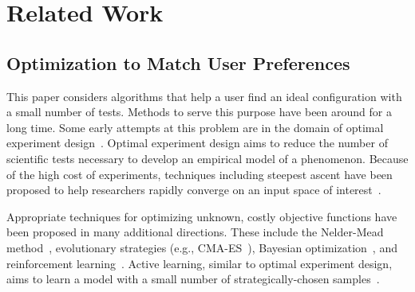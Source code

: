 \section{Related Work}

\subsection{Optimization to Match User Preferences}

This paper considers algorithms that help a user find an ideal configuration with a small number of tests.
Methods to serve this purpose have been around for a long time.
Some early attempts at this problem are in the domain of optimal experiment design~\cite{box_empirical_1987}.
Optimal experiment design aims to reduce the number of scientific tests necessary to develop an empirical model of a phenomenon.
Because of the high cost of experiments, techniques including steepest ascent have been proposed to help researchers rapidly converge on an input space of interest~\cite{box_empirical_1987}.

Appropriate techniques for optimizing unknown, costly objective functions have been proposed in many additional directions.
These include the Nelder-Mead method~\cite{nelder_simplex_1965},
evolutionary strategies (e.g., CMA-ES~\cite{hansen_adapting_1996}),
Bayesian optimization~\cite{brochu_tutorial_2010},
and reinforcement learning~\cite{sutton_reinforcement_1998}.
Active learning, similar to optimal experiment design, aims to learn a model with a small number of strategically-chosen samples~\cite{cohn_active_1996,settles_active_2010}.


